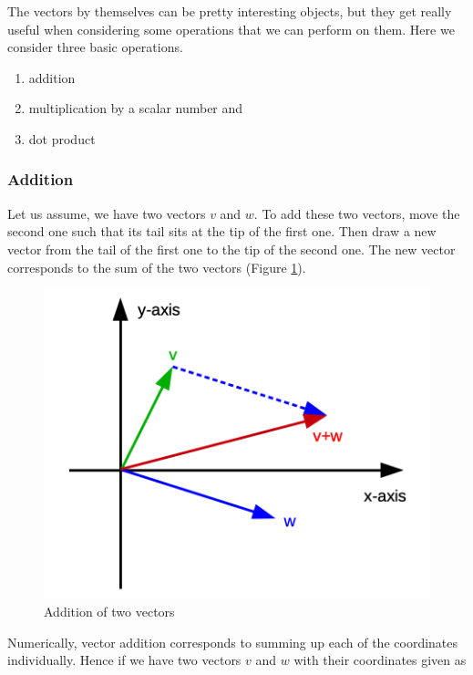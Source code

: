 \documentclass[
]{book}
\providecommand{\tightlist}{%
  \setlength{\itemsep}{0pt}\setlength{\parskip}{0pt}}
\theoremstyle{definition}
\theoremstyle{definition}
\theoremstyle{definition}
\theoremstyle{remark}
\begin{document}
The vectors by themselves can be pretty interesting objects, but they get really useful when considering some operations that we can perform on them. Here we consider three basic operations.

\begin{enumerate}
\def\labelenumi{\arabic{enumi}.}
\tightlist
\item
  addition
\item
  multiplication by a scalar number and
\item
  dot product
\end{enumerate}

\hypertarget{intro-linalg-vector-addition}{%
\subsubsection{Addition}\label{intro-linalg-vector-addition}}

Let us assume, we have two vectors \(v\) and \(w\). To add these two vectors, move the second one such that its tail sits at the tip of the first one. Then draw a new vector from the tail of the first one to the tip of the second one. The new vector corresponds to the sum of the two vectors (Figure \ref{fig:vector-sum}).

\begin{figure}
\includegraphics[width=12.22in]{odg/vector-sum} \caption{Addition of two vectors}\label{fig:vector-sum}
\end{figure}

Numerically, vector addition corresponds to summing up each of the coordinates individually. Hence if we have two vectors \(v\) and \(w\) with their coordinates given as
\end{document}
